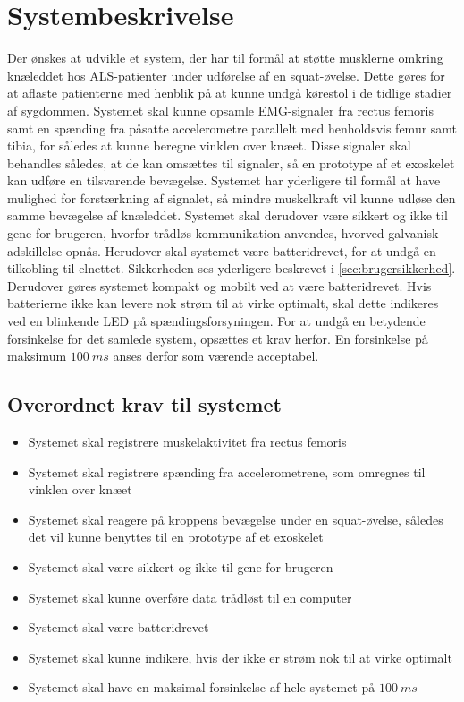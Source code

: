 \section{Systembeskrivelse}
Der ønskes at udvikle et system, der har til formål at støtte musklerne omkring knæleddet hos ALS-patienter under udførelse af en squat-øvelse. Dette gøres for at aflaste patienterne med henblik på at kunne undgå kørestol i de tidlige stadier af sygdommen. 
Systemet skal kunne opsamle EMG-signaler fra rectus femoris samt en spænding fra påsatte accelerometre parallelt med henholdsvis femur samt tibia, for således at kunne beregne vinklen over knæet. Disse signaler skal behandles således, at de kan omsættes til signaler, så en prototype af et exoskelet kan udføre en tilsvarende bevægelse. 
Systemet har yderligere til formål at have mulighed for forstærkning af signalet, så mindre muskelkraft vil kunne udløse den samme bevægelse af knæleddet. 
Systemet skal derudover være sikkert og ikke til gene for brugeren, hvorfor trådløs kommunikation anvendes, hvorved galvanisk adskillelse opnås. Herudover skal systemet være batteridrevet, for at undgå en tilkobling til elnettet. Sikkerheden ses yderligere beskrevet i \autoref{sec:brugersikkerhed}. Derudover gøres systemet kompakt og mobilt ved at være batteridrevet. Hvis batterierne ikke kan levere nok strøm til at virke optimalt, skal dette indikeres ved en blinkende LED på spændingsforsyningen. 
For at undgå en betydende forsinkelse for det samlede system, opsættes et krav herfor. En forsinkelse på maksimum $100~ms$ anses derfor som værende acceptabel. 

\subsection{Overordnet krav til systemet}  \label{sec:overordnet_krav}
\begin{itemize}
\item Systemet skal registrere muskelaktivitet fra rectus femoris 
\item Systemet skal registrere spænding fra accelerometrene, som omregnes til vinklen over knæet
\item Systemet skal reagere på kroppens bevægelse under en squat-øvelse, således det vil kunne benyttes til en prototype af et exoskelet
\item Systemet skal være sikkert og ikke til gene for brugeren 
\item Systemet skal kunne overføre data trådløst til en computer
\item Systemet skal være batteridrevet
\item Systemet skal kunne indikere, hvis der ikke er strøm nok til at virke optimalt
\item[\text{\sffamily \checkmark}] Systemet skal have en maksimal forsinkelse af hele systemet på $100~ms$
\end{itemize}


